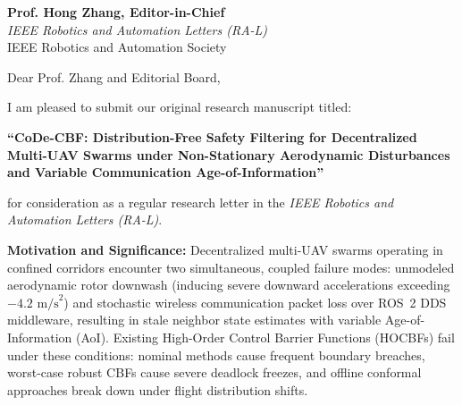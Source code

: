 \documentclass[11pt,a4paper]{letter}
\begin{document}
\begin{letter}{
  \textbf{Prof. Hong Zhang, Editor-in-Chief} \\
  \textit{IEEE Robotics and Automation Letters (RA-L)} \\
  IEEE Robotics and Automation Society
}

\opening{Dear Prof. Zhang and Editorial Board,}

I am pleased to submit our original research manuscript titled:
\begin{center}
\textbf{``CoDe-CBF: Distribution-Free Safety Filtering for Decentralized Multi-UAV Swarms under Non-Stationary Aerodynamic Disturbances and Variable Communication Age-of-Information''}
\end{center}
for consideration as a regular research letter in the \textit{IEEE Robotics and Automation Letters (RA-L)}.

\textbf{Motivation and Significance:}
Decentralized multi-UAV swarms operating in confined corridors encounter two simultaneous, coupled failure modes: unmodeled aerodynamic rotor downwash (inducing severe downward accelerations exceeding $-4.2\text{ m/s}^2$) and stochastic wireless communication packet loss over ROS~2 DDS middleware, resulting in stale neighbor state estimates with variable Age-of-Information (AoI). Existing High-Order Control Barrier Functions (HOCBFs) fail under these conditions: nominal methods cause frequent boundary breaches, worst-case robust CBFs cause severe deadlock freezes, and offline conformal approaches break down under flight distribution shifts.


\end{letter}
\end{document}
